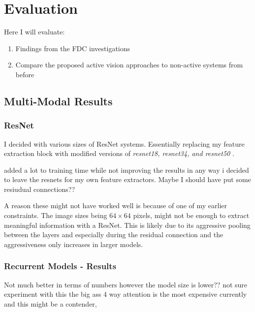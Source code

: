 \chapter{Evaluation}
Here I will evaluate:
\begin{enumerate}
  \item Findings from the FDC investigations
  \item Compare the proposed active vision approaches to non-active systems from before
\end{enumerate}





\section{Multi-Modal Results}

  

  

  

\subsection{ResNet}
I decided with various sizes of ResNet systems. Essentially replacing my feature extraction block with modified versions of \emph{resnet18, resnet34, and resnet50} .

added a lot to training time while not improving the results in any way i decided to leave the resnets for my own feature extractors. Maybe I should have put some resiudual connections??

A reason these might not have worked well is because of one of my earlier constraints. The image sizes being \(64 \times 64\) pixels, might not be enough to extract meaningful information with a ResNet. This is likely due to its aggressive pooling between the layers and especially during the residual connection and the aggressiveness only increases in larger models.  


\subsection{Recurrent Models - Results}
Not much better in terms of numbers however the model size is lower?? not sure experiment with this the big ass 4 way attention is the most expensive currently and this might be a contender,

